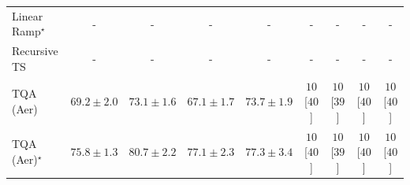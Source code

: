 \begin{tabular}{l|cccc|cccc|}
Linear Ramp$^\star$ & {\cellcolor[HTML]{000000}} \color[HTML]{F1F1F1} {\cellcolor{white}} \color{black} - & {\cellcolor[HTML]{000000}} \color[HTML]{F1F1F1} {\cellcolor{white}} \color{black} - & {\cellcolor[HTML]{000000}} \color[HTML]{F1F1F1} {\cellcolor{white}} \color{black} - & {\cellcolor[HTML]{000000}} \color[HTML]{F1F1F1} {\cellcolor{white}} \color{black} - & {\cellcolor[HTML]{000000}} \color[HTML]{F1F1F1} {\cellcolor{white}} \color{black} - & {\cellcolor[HTML]{000000}} \color[HTML]{F1F1F1} {\cellcolor{white}} \color{black} - & {\cellcolor[HTML]{000000}} \color[HTML]{F1F1F1} {\cellcolor{white}} \color{black} - & {\cellcolor[HTML]{000000}} \color[HTML]{F1F1F1} {\cellcolor{white}} \color{black} - \\
Recursive TS & {\cellcolor[HTML]{000000}} \color[HTML]{F1F1F1} {\cellcolor{white}} \color{black} - & {\cellcolor[HTML]{000000}} \color[HTML]{F1F1F1} {\cellcolor{white}} \color{black} - & {\cellcolor[HTML]{000000}} \color[HTML]{F1F1F1} {\cellcolor{white}} \color{black} - & {\cellcolor[HTML]{000000}} \color[HTML]{F1F1F1} {\cellcolor{white}} \color{black} - & {\cellcolor[HTML]{000000}} \color[HTML]{F1F1F1} {\cellcolor{white}} \color{black} - & {\cellcolor[HTML]{000000}} \color[HTML]{F1F1F1} {\cellcolor{white}} \color{black} - & {\cellcolor[HTML]{000000}} \color[HTML]{F1F1F1} {\cellcolor{white}} \color{black} - & {\cellcolor[HTML]{000000}} \color[HTML]{F1F1F1} {\cellcolor{white}} \color{black} - \\
TQA (Aer) & {\cellcolor[HTML]{FFF9C5}} \color[HTML]{000000} $69.2\pm 2.0$ & {\cellcolor[HTML]{FEDB80}} \color[HTML]{000000} $73.1\pm 1.6$ & {\cellcolor[HTML]{FFFFE5}} \color[HTML]{000000} $67.1\pm 1.7$ & {\cellcolor[HTML]{FED36F}} \color[HTML]{000000} $73.7\pm 1.9$ & {\cellcolor[HTML]{FFF7F3}} \color[HTML]{000000} $10$ [$40$] & {\cellcolor[HTML]{FFF7F3}} \color[HTML]{000000} $10$ [$39$] & {\cellcolor[HTML]{FFF7F3}} \color[HTML]{000000} $10$ [$40$] & {\cellcolor[HTML]{FFF7F3}} \color[HTML]{000000} $10$ [$40$] \\
TQA (Aer)$^\star$ & {\cellcolor[HTML]{FEB744}} \color[HTML]{000000} $75.8\pm 1.3$ & {\cellcolor[HTML]{E66A11}} \color[HTML]{F1F1F1} $80.7\pm 2.2$ & {\cellcolor[HTML]{FEA231}} \color[HTML]{000000} $77.1\pm 2.3$ & {\cellcolor[HTML]{FE9F2E}} \color[HTML]{000000} $77.3\pm 3.4$ & {\cellcolor[HTML]{FFF7F3}} \color[HTML]{000000} $10$ [$40$] & {\cellcolor[HTML]{FFF7F3}} \color[HTML]{000000} $10$ [$39$] & {\cellcolor[HTML]{FFF7F3}} \color[HTML]{000000} $10$ [$40$] & {\cellcolor[HTML]{FFF7F3}} \color[HTML]{000000} $10$ [$40$] \\

\end{tabular}
